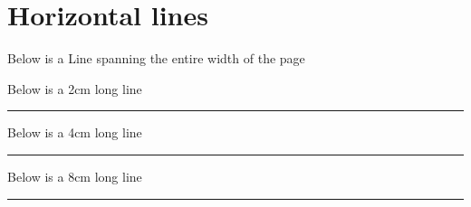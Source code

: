 \documentclass[12pt, letterpaper, oneside]{article}
\begin{document}
\section{Horizontal lines}

Below is a Line spanning the entire width of the page

\noindent\makebox[\linewidth]{\rule{\paperwidth}{0.4pt}}

Below is a 2cm long line

\noindent\rule{2cm}{0.4pt}

Below is a 4cm long line

\noindent\rule{4cm}{0.4pt}

Below is a 8cm long line

\noindent\rule{8cm}{0.4pt}
\end{document}
